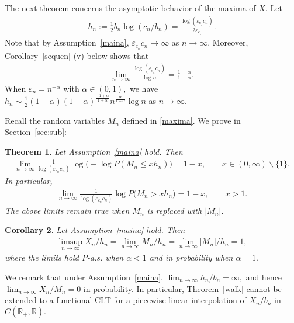 \documentclass[12pt]{amsart}
\newtheorem{theorem}{Theorem} \makeatletter
\newtheorem{corollary}[theorem]{Corollary}
\begin{document}
\par
The next theorem concerns the asymptotic behavior of the maxima of
$X.$ Let \begin{eqnarray} \label{aihn} h_n :={\frac {\displaystyle {1}}{\displaystyle {2} }} b_n \log (c_n/b_n
)={\frac {\displaystyle {\log({\varepsilon}_{c_{_{n}}} c_n)}}{\displaystyle {2{\varepsilon}_{c_{_{n}}}} }}. \end{eqnarray} Note
that by Assumption~\ref{maina}, ${\varepsilon}_{c_{_{n}}} c_n\to\infty$ as
$n\to\infty.$ Moreover, Corollary~\ref{sequen}-(v) below shows that
\begin{eqnarray*} \lim_{n\to\infty} {\frac {\displaystyle {\log({\varepsilon}_{c_{_{n}}} c_n)}}{\displaystyle {\log n} }}=
{\frac {\displaystyle {1-\alpha}}{\displaystyle {1+\alpha} }} .\end{eqnarray*} When ${\varepsilon}_n=n^{-\alpha}$ with
$\alpha \in (0,1),$ we have $h_n\sim
{\frac {\displaystyle {1}}{\displaystyle {2} }}(1-\alpha)(1+\alpha)^{\frac{-1+\alpha}{1+\alpha}}
n^{\frac{\alpha}{1+\alpha}}\log n$ as $n\to\infty.$ \par Recall the
random variables $M_n$ defined in \eqref{maxima}. We prove in
Section~\ref{sec:sub}:
\begin{theorem}
\label{supt} Let Assumption~\ref{maina} hold. Then \begin{eqnarray*}
\lim_{n\to\infty} {\frac {\displaystyle {1}}{\displaystyle {\log ({\varepsilon}_{c_{n}} c_n)} }} \log\bigl(-
\log P(M_n \leq x h_n)\bigr)=1-x,\qquad x\in
(0,\infty)\backslash\{1\}.\end{eqnarray*} In particular, \begin{eqnarray*} \lim_{n\to\infty}
{\frac {\displaystyle {1}}{\displaystyle {\log ({\varepsilon}_{c_{n}} c_n)} }} \log P\bigl(M_n  >x
h_n\bigr)=1-x,\qquad x>1. \end{eqnarray*} The above limits remain true when
$M_n$ is replaced with $|M_n|$.
\end{theorem}
\begin{corollary}
\label{cor:supt} Let Assumption~\ref{maina} hold. Then
\begin{eqnarray*} \limsup_{n\to\infty} X_n / h_n = \lim_{n\to\infty} M_n/h_n =
\lim_{n\to\infty} |M_n|/h_n =1,\end{eqnarray*}  where the limits hold $P$-\mbox{\rm a.s.}
when $\alpha<1$ and in probability when $\alpha=1.$
\end{corollary}
We remark that under Assumption~\ref{maina}, $\lim_{n\to\infty} h_n / b_n = \infty,$ and hence
$\lim_{n\to\infty} X_n/M_n=0$ in probability. In particular, Theorem~\ref{walk} cannot be extended
to a functional CLT for a piecewise-linear interpolation of $X_n/b_n$ in $C({{\mathbb R}}_+,{{\mathbb R}}).$
\end{document}

